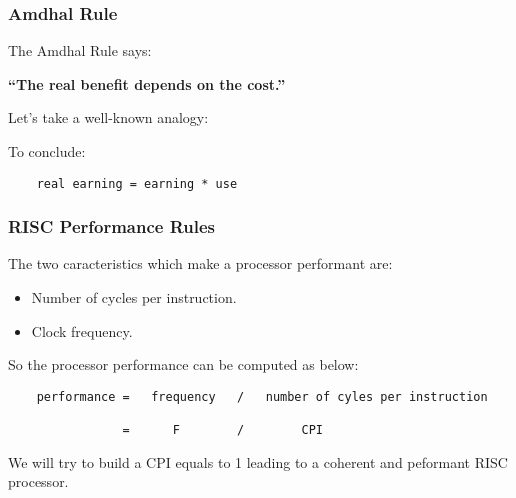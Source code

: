 
\begin{frame}[containsverbatim]
  \frametitle{Amdhal Rule}

  The Amdhal Rule says:

  \nl

  \textbf{``The real benefit depends on the cost.''}

  \nl

  Let's take a well-known analogy:

  \begin{center}
  \end{center}

  To conclude:

  \begin{verbatim}
    real earning = earning * use
  \end{verbatim}
\end{frame}


\begin{frame}[containsverbatim]
  \frametitle{RISC Performance Rules}

  The two caracteristics which make a processor performant are:

  \begin{itemize}
    \item
      Number of cycles per instruction.
    \item
      Clock frequency.
  \end{itemize}

  So the processor performance can be computed as below:

  \begin{verbatim}
    performance =   frequency   /   number of cyles per instruction

                =      F        /        CPI
  \end{verbatim}

  We will try to build a CPI equals to 1 leading to a coherent and peformant
  RISC processor.
\end{frame}


